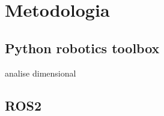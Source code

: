 \chapter{Metodologia}\label{cap:methods}

\section{Python robotics toolbox}

analise dimensional

\section{ROS2}
